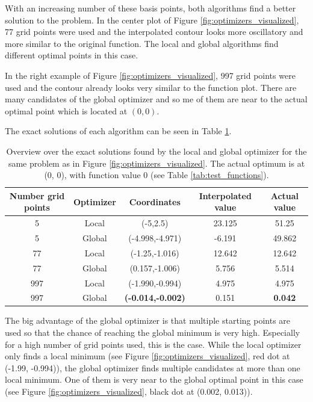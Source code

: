 With an increasing number of these basis points, both algorithms find a better solution to the problem. In the center plot of Figure \ref{fig:optimizers_visualized}, 77 grid points were used and the interpolated contour looks more oscillatory and more similar to the original function. The local and global algorithms find different optimal points in this case. 

In the right example of Figure \ref{fig:optimizers_visualized}, 997 grid points were used and the contour already looks very similar to the function plot. There are many candidates of the global optimizer and so	me of them are near to the actual optimal point which is located at $ (0, 0) $. 


The exact solutions of each algorithm can be seen in Table \ref{tab:optimizer_vis_function}.
\begin{table}[h!]
	\caption{ Overview over the exact solutions found by the local and global optimizer for the same problem as in Figure \ref{fig:optimizers_visualized}. The actual optimum is at (0, 0), with function value 0 (see Table \ref{tab:test_functions}).}
	\label{tab:optimizer_vis_function}
	\centering
	\begin{tabular}{|c c c c c|} 
		\hline
		Number grid points & Optimizer & Coordinates & Interpolated value & Actual value \\
		\hline
		5 & Local &  (-5,2.5)  &  23.125  &  51.25  \\
		5 & Global &  (-4.998,-4.971)  &  -6.191  &  49.862  \\
		77 & Local &  (-1.25,-1.016)  &  12.642  &  12.642  \\
		77 & Global &  (0.157,-1.006)  &  5.756  &  5.514  \\
		997 & Local &  (-1.990,-0.994)  &  4.975  &  4.975  \\
		997 & Global & \textbf{(-0.014,-0.002)} & 0.151 & \textbf{0.042} \\
		\hline
	\end{tabular}
\end{table}

The big advantage of the global optimizer is that multiple starting points are used so that the chance of reaching the global minimum is very high. Especially for a high number of grid points used, this is the case. While the local optimizer only finds a local minimum (see Figure \ref{fig:optimizers_visualized}, red dot at (-1.99, -0.994)), the global optimizer finds multiple candidates at more than one local minimum. One of them is very near to the global optimal point in this case (see Figure \ref{fig:optimizers_visualized}, black dot at (0.002, 0.013)). \newline 


